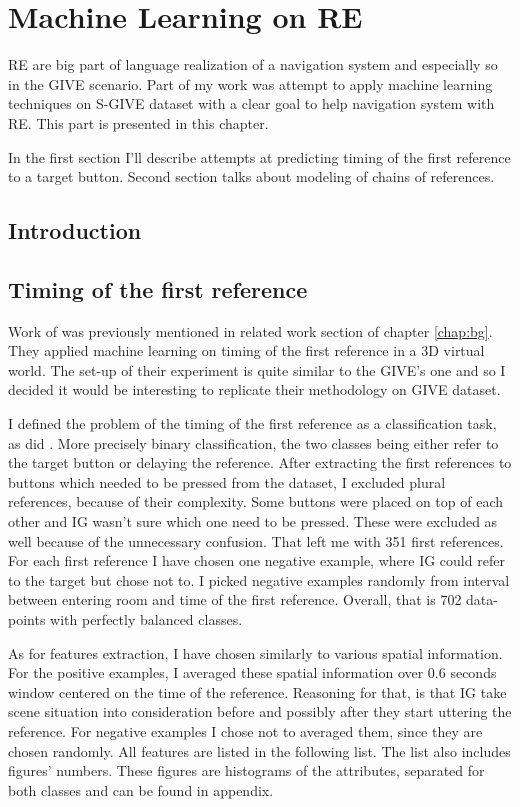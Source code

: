 \chapter{Machine Learning on RE}
RE are big part of language realization of a navigation system and especially so in the GIVE scenario. Part of my work was attempt to apply machine learning techniques on S-GIVE dataset with a clear goal to help navigation system with RE. This part is presented in this chapter.

In the first section I'll describe attempts at predicting timing of the first reference to a target button. Second section talks about modeling of chains of references.

\section{Introduction}
\section{Timing of the first reference}
Work of \citet{stoia2006sentence} was previously mentioned in related work section of chapter \ref{chap:bg}. They applied machine learning on timing of the first reference in a 3D virtual world. The set-up of their experiment is quite similar to the GIVE's one and so I decided it would be interesting to replicate their methodology on GIVE dataset. 

I defined the problem of the timing of the first reference as a classification task, as did \citet{stoia2006sentence}. More precisely binary classification, the two classes being either refer to the target button or delaying the reference. After extracting the first references to buttons which needed to be pressed from the dataset, I excluded plural references, because of their complexity. Some buttons were placed on top of each other and IG wasn't sure which one need to be pressed. These were excluded as well because of the unnecessary confusion. That left me with 351 first references. For each first reference I have chosen one negative example, where IG could refer to the target but chose not to. I picked negative examples randomly from interval between entering room and time of the first reference. Overall, that is 702 data-points with perfectly balanced classes.

As for features extraction, I have chosen similarly to \citet{stoia2006sentence} various spatial information. For the positive examples, I averaged these spatial information over 0.6 seconds window centered on the time of the reference. Reasoning for that, is that IG take scene situation into consideration before and possibly after they start uttering the reference. For negative examples I chose not to averaged them, since they are chosen randomly. All features are listed in the following list. The list also includes figures' numbers. These figures are histograms of the attributes, separated for both classes and can be found in appendix.

